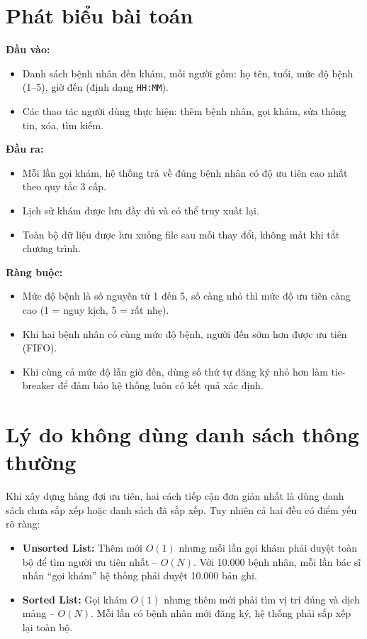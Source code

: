 \documentclass[12pt,a4paper]{report}
\newcommand{\bigO}[1]{$O(#1)$}
\begin{document}
\section{Phát biểu bài toán}

\textbf{Đầu vào:}
\begin{itemize}
  \item Danh sách bệnh nhân đến khám, mỗi người gồm: họ tên, tuổi, mức độ
        bệnh (1--5), giờ đến (định dạng \texttt{HH:MM}).
  \item Các thao tác người dùng thực hiện: thêm bệnh nhân, gọi khám, sửa
        thông tin, xóa, tìm kiếm.
\end{itemize}

\textbf{Đầu ra:}
\begin{itemize}
  \item Mỗi lần gọi khám, hệ thống trả về đúng bệnh nhân có độ ưu tiên cao
        nhất theo quy tắc 3 cấp.
  \item Lịch sử khám được lưu đầy đủ và có thể truy xuất lại.
  \item Toàn bộ dữ liệu được lưu xuống file sau mỗi thay đổi, không mất khi
        tắt chương trình.
\end{itemize}

\textbf{Ràng buộc:}
\begin{itemize}
  \item Mức độ bệnh là số nguyên từ 1 đến 5, số càng nhỏ thì mức độ ưu tiên
        càng cao (1 = nguy kịch, 5 = rất nhẹ).
  \item Khi hai bệnh nhân có cùng mức độ bệnh, người đến sớm hơn được ưu tiên
        (FIFO).
  \item Khi cùng cả mức độ lẫn giờ đến, dùng số thứ tự đăng ký nhỏ hơn làm
        tie-breaker để đảm bảo hệ thống luôn có kết quả xác định.
\end{itemize}

\section{Lý do không dùng danh sách thông thường}

Khi xây dựng hàng đợi ưu tiên, hai cách tiếp cận đơn giản nhất là dùng danh
sách chưa sắp xếp hoặc danh sách đã sắp xếp. Tuy nhiên cả hai đều có điểm
yếu rõ ràng:

\begin{itemize}
  \item \textbf{Unsorted List:} Thêm mới \bigO{1} nhưng mỗi lần gọi khám
        phải duyệt toàn bộ để tìm người ưu tiên nhất -- \bigO{N}. Với 10.000
        bệnh nhân, mỗi lần bác sĩ nhấn ``gọi khám'' hệ thống phải duyệt
        10.000 bản ghi.
  \item \textbf{Sorted List:} Gọi khám \bigO{1} nhưng thêm mới phải tìm vị
        trí đúng và dịch mảng -- \bigO{N}. Mỗi lần có bệnh nhân mới đăng ký,
        hệ thống phải sắp xếp lại toàn bộ.
\end{itemize}
\end{document}

